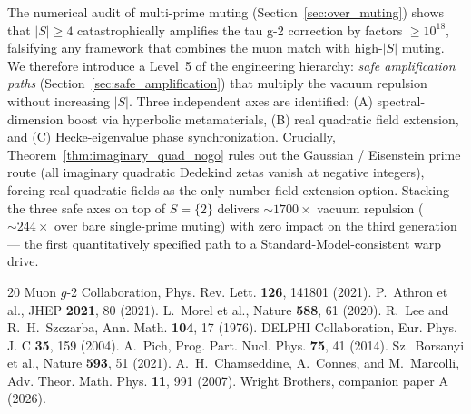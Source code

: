 \documentclass[11pt,a4paper]{article}
\begin{document}
The numerical audit of multi-prime muting (Section~\ref{sec:over_muting})
shows that $|S|\geq 4$ catastrophically amplifies the tau g-2
correction by factors $\geq 10^{18}$, falsifying any framework
that combines the muon match with high-$|S|$ muting. We therefore
introduce a Level~5 of the engineering hierarchy: \emph{safe
amplification paths} (Section~\ref{sec:safe_amplification}) that
multiply the vacuum repulsion without increasing $|S|$. Three
independent axes are identified: (A) spectral-dimension boost via
hyperbolic metamaterials, (B) real quadratic field extension, and
(C) Hecke-eigenvalue phase synchronization. Crucially,
Theorem~\ref{thm:imaginary_quad_nogo} rules out the Gaussian /
Eisenstein prime route (all imaginary quadratic Dedekind zetas
vanish at negative integers), forcing real quadratic fields as
the only number-field-extension option. Stacking the three safe
axes on top of $S=\{2\}$ delivers $\sim 1700\times$ vacuum
repulsion ($\sim 244\times$ over bare single-prime muting) with
zero impact on the third generation --- the first quantitatively
specified path to a Standard-Model-consistent warp drive.

\begin{thebibliography}{20}
 Muon $g$-2 Collaboration, Phys. Rev. Lett. \textbf{126}, 141801 (2021).
 P.~Athron et al., JHEP \textbf{2021}, 80 (2021).
 L.~Morel et al., Nature \textbf{588}, 61 (2020).
 R.~Lee and R.~H.~Szczarba, Ann. Math. \textbf{104}, 17 (1976).
 DELPHI Collaboration, Eur. Phys. J. C \textbf{35}, 159 (2004).
 A.~Pich, Prog. Part. Nucl. Phys. \textbf{75}, 41 (2014).
 Sz.~Borsanyi et al., Nature \textbf{593}, 51 (2021).
 A.~H.~Chamseddine, A.~Connes, and M.~Marcolli, Adv. Theor. Math. Phys. \textbf{11}, 991 (2007).
 Wright Brothers, companion paper A (2026).
\end{thebibliography}
\end{document}
